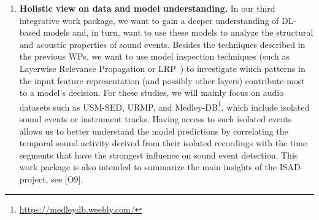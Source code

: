 \documentclass[11pt,a4paper]{article}
\def\PN{\mathrm{ISAD}}
\newcommand{\jakob}[1]{{\color{magenta} #1}}
\theoremstyle{plain} \newtheorem{define}{Definition}[section]
\begin{document}
{\begin{enumerate}[itemindent=0.5cm]
\item  \label{WJ:understand}
\textbf{Holistic view on data and model understanding.} 
%
In our third integrative work package, we want to gain a deeper understanding of DL-based models and, in turn, want to use these models to analyze the structural and acoustic properties of sound events.
%
Besides the techniques described in the previous WPs, we want to use model inspection techniques (such as Layerwise Relevance Propagation or LRP~\cite{Montavon:2019:LRP:BOOK}) to investigate which patterns in the input feature representation (and possibly other layers) contribute most to a model's decision.
%
For these studies, we will mainly focus on audio datasets such as USM-SED, URMP, and Medley-DB\footnote{\url{https://medleydb.weebly.com/}}, which include isolated sound events or instrument tracks. Having access to such isolated events allows us to better understand the model predictions by correlating the temporal sound activity derived from their isolated recordings with the time segments that have the strongest influence on sound event detection.
%
This work package is also intended to summarize the main insights of the $\PN$-project, see [O9].


\end{enumerate}

}
\end{document}
